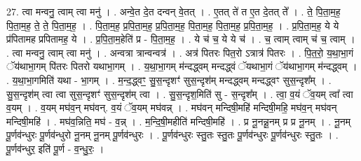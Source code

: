 \documentclass[17pt]{extarticle}
\begin{document}
27. त्वा मन्वनु॒ त्वाम् त्वा मनु॑ । . अन्वे॒त दे॒त दन्वन् वे॒तत् । . ए॒तत् ते॑ त ए॒त दे॒तत् ते᳚ । . ते॒ पि॒ता॒म॒ह॒ पि॒ता॒म॒ह॒ ते॒ ते॒ पि॒ता॒म॒ह॒ । . पि॒ता॒म॒ह॒ प्र॒पि॒ता॒म॒ह॒ प्र॒पि॒ता॒म॒ह॒ पि॒ता॒म॒ह॒ पि॒ता॒म॒ह॒ प्र॒पि॒ता॒म॒ह॒ । . प्र॒पि॒ता॒म॒ह॒ ये ये प्र॑पितामह प्रपितामह॒ ये । . प्र॒पि॒ता॒म॒हेति॑ प्र - पि॒ता॒म॒ह॒ । . ये च॑ च॒ ये ये च॑ । . च॒ त्वाम् त्वाम् च॑ च॒ त्वाम् । . त्वा मन्वनु॒ त्वाम् त्वा मनु॑ । . अन्वत्रा त्रान्वन्वत्र॑ । . अत्र॑ पितरः पित॒रो ऽत्रात्र॑ पितरः । . पि॒त॒रो॒ य॒था॒भा॒गं ॅय॑थाभा॒गम् पि॑तरः पितरो यथाभा॒गम् । . य॒था॒भा॒गम् म॑न्दद्ध्वम् मन्दद्ध्वं ॅयथाभा॒गं ॅय॑थाभा॒गम् म॑न्दद्ध्वम् । . य॒था॒भा॒गमिति॑ यथा - भा॒गम् । . म॒न्द॒द्ध्वꣳ॒॒ सु॒स॒न्दृशꣳ॑ सुस॒न्दृश॑म् मन्दद्ध्वम् मन्दद्ध्वꣳ सुस॒न्दृश᳚म् । . सु॒स॒न्दृश॑म् त्वा त्वा सुस॒न्दृशꣳ॑ सुस॒न्दृश॑म् त्वा । . सु॒स॒न्दृश॒मिति॑ सु - स॒न्दृश᳚म् । . त्वा॒ व॒यं ॅव॒यम् त्वा᳚ त्वा व॒यम् । . व॒यम् मघ॑व॒न् मघ॑वन्. व॒यं ॅव॒यम् मघ॑वन्न् । . मघ॑वन् मन्दिषी॒महि॑ मन्दिषी॒महि॒ मघ॑व॒न् मघ॑वन् मन्दिषी॒महि॑ । . मघ॑व॒न्निति॒ मघ॑ - व॒न्न् । . म॒न्दि॒षी॒महीति॑ मन्दिषी॒महि॑ । . प्र नू॒नन्नू॒नम् प्र प्र नू॒नम् । . नू॒नम् पू॒र्णव॑न्धुरः पू॒र्णव॑न्धुरो नू॒नम् नू॒नम् पू॒र्णव॑न्धुरः । . पू॒र्णव॑न्धुरः स्तु॒तः स्तु॒तः पू॒र्णव॑न्धुरः पू॒र्णव॑न्धुरः स्तु॒तः । . पू॒र्णव॑न्धुर॒ इति॑ पू॒र्ण - व॒न्धु॒रः॒ । \newline
\end{document}
